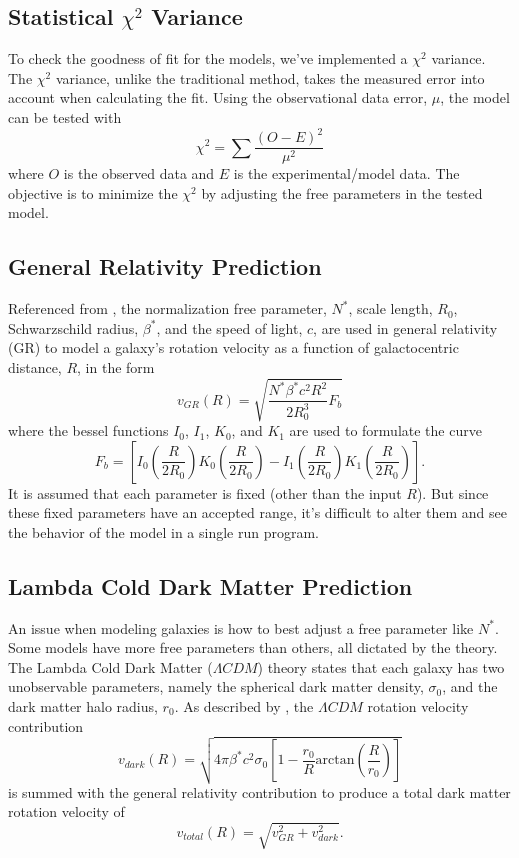 \documentclass[conference]{IEEEtran-modified}
\begin{document}
\subsection{Statistical $\chi^2$ Variance}
To check the goodness of fit for the models, we've implemented a $\chi^2$ variance. The $\chi^2$ variance, unlike the traditional method, takes the measured error into account when calculating the fit. Using the observational data error, $\mu$, the model can be tested with
\begin{equation}
\chi^2 = \sum \frac{(O-E)^2}{\mu^2}
\end{equation} 
where $O$ is the observed data and $E$ is the experimental/model data. The objective is to minimize the $\chi^2$ by adjusting the free parameters in the tested model.

\subsection{General Relativity Prediction}

Referenced from \cite{mannheim}, the normalization free parameter, $N^*$, scale length, $R_0$, Schwarzschild radius, $\beta^*$, and the speed of light, $c$, are used in general relativity (GR) to model a galaxy's rotation velocity as a function of galactocentric distance, $R$, in the form
\begin{equation}
v_{GR}(R) = \sqrt{\frac{N^*\beta^*c^2R^2}{2R^3_0}F_b}
\end{equation}
where the bessel functions $I_0$, $I_1$, $K_0$, and $K_1$ are used to formulate the curve
\begin{equation}
F_b = \left[I_0\left(\frac{R}{2R_0}\right)K_0\left(\frac{R}{2R_0}\right)-I_1\left(\frac{R}{2R_0}\right)K_1\left(\frac{R}{2R_0}\right)\right].
\end{equation}
It is assumed that each parameter is fixed (other than the input $R$). But since these fixed parameters have an accepted range, it's difficult to alter them and see the behavior of the model in a single run program.   


\subsection{Lambda Cold Dark Matter Prediction}
An issue when modeling galaxies is how to best adjust a free parameter like $N^*$. Some models have more free parameters than others, all dictated by the theory. The Lambda Cold Dark Matter ($\Lambda CDM$) theory states that each galaxy has two unobservable parameters, namely the spherical dark matter density, $\sigma_0$, and the dark matter halo radius, $r_0$. As described by \cite{mannheim}, the $\Lambda CDM$ rotation velocity contribution
\begin{equation}
v_{dark}(R) = \sqrt{4\pi\beta^*c^2\sigma_0\left[1-\frac{r_0}{R}\text{arctan}\left(\frac{R}{r_0}\right)\right]}
\end{equation}
is summed with the general relativity contribution to produce a total dark matter rotation velocity of 
\begin{equation}
v_{total}(R) = \sqrt{v_{GR}^2 + v_{dark}^2}.
\end{equation}
\end{document}
